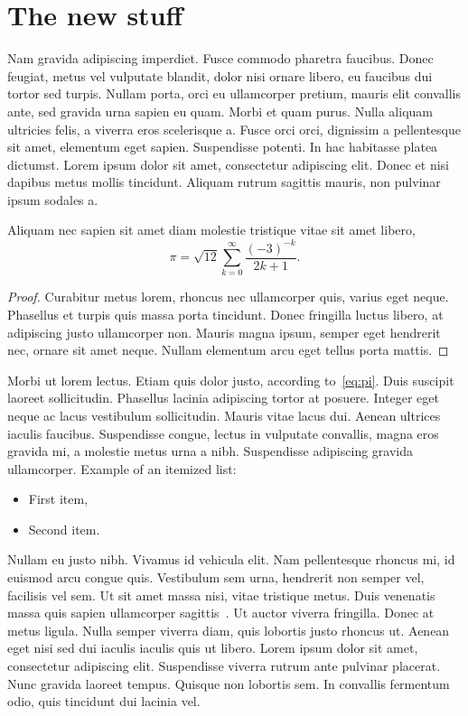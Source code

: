 \documentclass[submission]{gmp2015}
\begin{document}
\section{The new stuff}

Nam gravida adipiscing imperdiet. Fusce commodo pharetra faucibus. Donec feugiat, metus vel vulputate blandit, dolor nisi ornare libero, eu faucibus dui tortor sed turpis. Nullam porta, orci eu ullamcorper pretium, mauris elit convallis ante, sed gravida urna sapien eu quam. Morbi et quam purus. Nulla aliquam ultricies felis, a viverra eros scelerisque a. Fusce orci orci, dignissim a pellentesque sit amet, elementum eget sapien. Suspendisse potenti. In hac habitasse platea dictumst. Lorem ipsum dolor sit amet, consectetur adipiscing elit. Donec et nisi dapibus metus mollis tincidunt. Aliquam rutrum sagittis mauris, non pulvinar ipsum sodales a.

\begin{theorem}\label{theorem:pi}
Aliquam nec sapien sit amet diam molestie tristique vitae sit amet libero,
\begin{equation}\label{eq:pi}
\pi = \sqrt{12}\sum^\infty_{k=0} \frac{(-3)^{-k}}{2k+1}.
\end{equation}
\end{theorem}

\begin{proof}
Curabitur metus lorem, rhoncus nec ullamcorper quis, varius eget neque. Phasellus et turpis quis massa porta tincidunt. Donec fringilla luctus libero, at adipiscing justo ullamcorper non. Mauris magna ipsum, semper eget hendrerit nec, ornare sit amet neque. Nullam elementum arcu eget tellus porta mattis.
\end{proof}

\noindent
Morbi ut lorem lectus. Etiam quis dolor justo, according to~\eqref{eq:pi}. Duis suscipit laoreet sollicitudin. Phasellus lacinia adipiscing tortor at posuere. Integer eget neque ac lacus vestibulum sollicitudin. Mauris vitae lacus dui. Aenean ultrices iaculis faucibus. Suspendisse congue, lectus in vulputate convallis, magna eros gravida mi, a molestie metus urna a nibh. Suspendisse adipiscing gravida ullamcorper.
%
Example of an itemized list:
\begin{itemize}
  \item First item,
  \item Second item.
\end{itemize}

\noindent
Nullam eu justo nibh. Vivamus id vehicula elit. Nam pellentesque rhoncus mi, id euismod arcu congue quis. Vestibulum sem urna, hendrerit non semper vel, facilisis vel sem. Ut sit amet massa nisi, vitae tristique metus. Duis venenatis massa quis sapien ullamcorper sagittis~\cite{Li:2010:PSO}. Ut auctor viverra fringilla. Donec at metus ligula. Nulla semper viverra diam, quis lobortis justo rhoncus ut. Aenean eget nisi sed dui iaculis iaculis quis ut libero. Lorem ipsum dolor sit amet, consectetur adipiscing elit. Suspendisse viverra rutrum ante pulvinar placerat. Nunc gravida laoreet tempus. Quisque non lobortis sem. In convallis fermentum odio, quis tincidunt dui lacinia vel.
\end{document}
